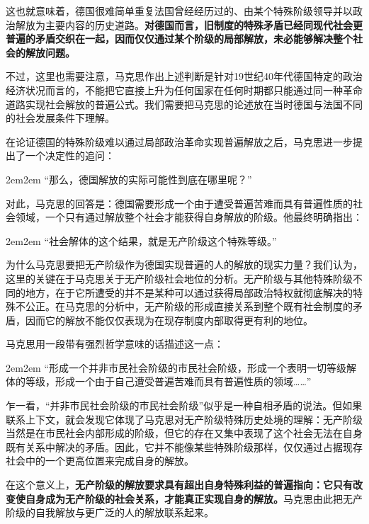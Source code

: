 \documentclass[a4paper,twoside,12pt,AutoFakeBold]{ctexart}
\begin{document}
这也就意味着，德国很难简单重复法国曾经经历过的、由某个特殊阶级领导并以政治解放为主要内容的历史道路。\textbf{对德国而言，旧制度的特殊矛盾已经同现代社会更普遍的矛盾交织在一起，因而仅仅通过某个阶级的局部解放，未必能够解决整个社会的解放问题。}

不过，这里也需要注意，马克思作出上述判断是针对19世纪40年代德国特定的政治经济状况而言的，不能把它直接上升为任何国家在任何时期都只能通过同一种革命道路实现社会解放的普遍公式。我们需要把马克思的论述放在当时德国与法国不同的社会发展条件下理解。


在论证德国的特殊阶级难以通过局部政治革命实现普遍解放之后，马克思进一步提出了一个决定性的追问：

\begin{adjustwidth}{2em}{2em}
\qquad\fangsong
“那么，德国解放的实际可能性到底在哪里呢？”
\end{adjustwidth}

对此，马克思的回答是：德国需要形成一个由于遭受普遍苦难而具有普遍性质的社会领域，一个只有通过解放整个社会才能获得自身解放的阶级。他最终明确指出：

\begin{adjustwidth}{2em}{2em}
\qquad\fangsong
“社会解体的这个结果，就是无产阶级这个特殊等级。”
\end{adjustwidth}

为什么马克思要把无产阶级作为德国实现普遍的人的解放的现实力量？我们认为，这里的关键在于马克思关于无产阶级社会地位的分析。无产阶级与其他特殊阶级不同的地方，在于它所遭受的并不是某种可以通过获得局部政治特权就彻底解决的特殊不公正。在马克思的分析中，无产阶级的形成直接关系到整个既有社会制度的矛盾，因而它的解放不能仅仅表现为在现存制度内部取得更有利的地位。

马克思用一段带有强烈哲学意味的话描述这一点：

\begin{adjustwidth}{2em}{2em}
\qquad\fangsong
“形成一个并非市民社会阶级的市民社会阶级，形成一个表明一切等级解体的等级，形成一个由于自己遭受普遍苦难而具有普遍性质的领域……”
\end{adjustwidth}

乍一看，“并非市民社会阶级的市民社会阶级”似乎是一种自相矛盾的说法。但如果联系上下文，就会发现它体现了马克思对无产阶级特殊历史处境的理解：无产阶级当然是在市民社会内部形成的阶级，但它的存在又集中表现了这个社会无法在自身既有关系中解决的矛盾。因此，它并不能像某些特殊阶级那样，仅仅通过占据现存社会中的一个更高位置来完成自身的解放。

在这个意义上，\textbf{无产阶级的解放要求具有超出自身特殊利益的普遍指向：它只有改变使自身成为无产阶级的社会关系，才能真正实现自身的解放。}马克思由此把无产阶级的自我解放与更广泛的人的解放联系起来。
\end{document}
